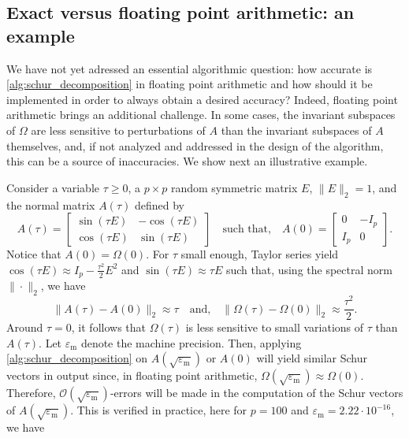 \documentclass[10pt,twoside,dvipsnames]{siamart1116}
\numberwithin{algorithm}{section}
\numberwithin{equation}{section}
\begin{document}
	 \subsection{Exact versus floating point arithmetic: an example}\label{sec:sensitivity} We have not yet adressed an essential algorithmic question: how accurate is \cref{alg:schur_decomposition} in floating point arithmetic and how should it be implemented in order to always obtain a desired accuracy? Indeed, floating point arithmetic brings an additional challenge. In some cases, the invariant subspaces of $\Omega$ are less sensitive to perturbations of $A$ than the invariant subspaces of $A$ themselves, and, if not analyzed and addressed in the design of the algorithm, this can be a source of inaccuracies. We show next an illustrative example.
	 
	Consider a variable $\tau\geq 0$, a $p\times p$ random symmetric matrix $E$, $\|E\|_2=1$, and the normal matrix $A(\tau)$ defined by
	\begin{equation*}
	A(\tau) = \begin{bmatrix}
	\sin(\tau E)&-\cos(\tau E)\\
	\cos(\tau E)&\sin(\tau E)
	\end{bmatrix}\quad\text{such that,}\quad  A(0)=\begin{bmatrix}0&-I_p\\
	I_p&0 \end{bmatrix}.
	\end{equation*}
Notice that $A(0)=\Omega(0)$. For $\tau$ small enough, Taylor series yield $\cos(\tau E)\approx I_p -\frac{\tau^2}{2}E^2$ and $\sin(\tau E)\approx \tau E$ such that, using the spectral norm $\|\cdot\|_2$, we have
\begin{equation*}
	 \|A(\tau)-A(0)\|_2\approx \tau \quad\text{and,}\quad  \|\Omega(\tau)-\Omega(0)\|_2\approx \frac{\tau^2}{2}.
\end{equation*} 
Around $\tau=0$, it follows that $\Omega(\tau)$ is less sensitive to small variations of $\tau$ than $A(\tau)$. Let $\varepsilon_\mathrm{m}$ denote the machine precision. Then, applying \cref{alg:schur_decomposition} on $A(\sqrt{\varepsilon_\mathrm{m}})$ or $A(0)$ will yield similar Schur vectors in output since, in floating point arithmetic, $\Omega(\sqrt{\varepsilon_\mathrm{m}})\approx \Omega(0)$. Therefore, $\mathcal{O}(\sqrt{\varepsilon_\mathrm{m}})$-errors will be made in the computation of the Schur vectors of $A(\sqrt{\varepsilon_\mathrm{m}})$. This is verified in practice, here for $p=100$ and $\varepsilon_\mathrm{m}=2.22\cdot 10^{-16}$, we have
\end{document}
